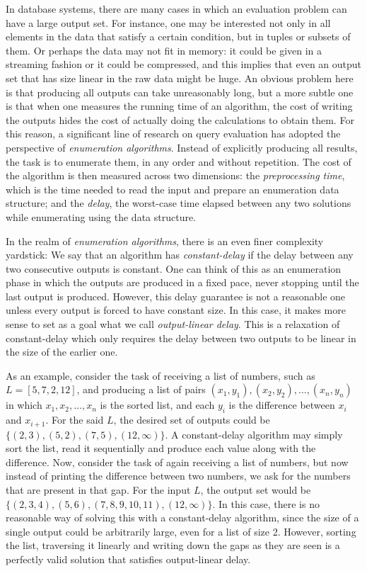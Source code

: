 In database systems, there are many cases in which an evaluation problem can have a large output set. For instance, one may be interested not only in all elements in the data that satisfy a certain condition, but in tuples or subsets of them. Or perhaps the data may not fit in memory: it could be given in a streaming fashion or it could be compressed, and this implies that even an output set that has size linear in the raw data might be huge. An obvious problem here is that producing all outputs can take unreasonably long, but a more subtle one is that when one measures the running time of an algorithm, the cost of writing the outputs hides the cost of actually doing the calculations to obtain them.
For this reason, a significant line
of research on query evaluation has adopted the perspective of {\it enumeration algorithms}.
Instead of explicitly producing all results, the task is to enumerate them, in any order and
without repetition. The cost of the algorithm is then measured across two dimensions:
the {\it preprocessing time}, which is the time needed to read the input and prepare an
enumeration data structure; and the {\it delay}, the worst-case time elapsed between any two
solutions while enumerating using the data structure.


In the realm of {\it enumeration algorithms}, there is an even finer complexity yardstick:
We say that an algorithm has {\it constant-delay} if the delay between any two consecutive outputs is constant. One can think of this as an enumeration phase in which the outputs are produced in a fixed pace, never stopping until the last output is produced. However, this delay guarantee is not a reasonable one unless every output is forced to have constant size. In this case, it makes more sense to set as a goal what we call {\it output-linear delay}. This is a relaxation of constant-delay which only requires the delay between two outputs to be linear in the size of the earlier one.

As an example, consider the task of receiving a list of numbers, such as $L = [5, 7, 2, 12]$, and producing a list of pairs $(x_1,y_1),(x_2,y_2),\ldots,(x_n,y_n)$ in which $x_1,x_2,\ldots,x_n$ is the sorted list, and each $y_i$ is the difference between $x_i$ and $x_{i+1}$. For the said $L$, the desired set of outputs could be $\{(2,3), (5,2), (7,5),(12,\infty)\}$. A constant-delay algorithm may simply sort the list, read it sequentially and produce each value along with the difference. Now, consider the task of again receiving a list of numbers, but now instead of printing the difference between two numbers, we ask for the numbers that are present in that gap. For the input $L$, the output set would be $\{(2,3,4),(5,6),(7,8,9,10,11),(12,\infty)\}$. In this case, there is no reasonable way of solving this with a constant-delay algorithm, since the size of a single output could be arbitrarily large, even for a list of size 2. However, sorting the list, traversing it linearly and writing down the gaps as they are seen is a perfectly valid solution that satisfies output-linear delay.

